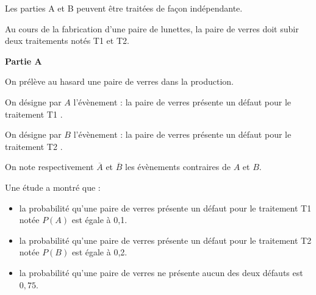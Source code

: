 \bigskip

Les parties A et B peuvent être traitées de façon indépendante.

\medskip

Au cours de la fabrication d'une paire de lunettes, la paire de verres doit subir deux traitements notés T1 et T2.

\bigskip

\textbf{Partie A}

\medskip

On prélève au hasard une paire de verres dans la production.

On désigne par $A$ l'évènement : \og la paire de verres présente un défaut pour le traitement T1 \fg.

On désigne par $B$ l'évènement : \og la paire de verres présente un défaut pour le traitement T2 \fg.

On note respectivement $\overline{A}$ et $\overline{B}$ les évènements contraires de $A$ et $B$.

Une étude a montré que :

\begin{itemize}
\item la probabilité qu'une paire de verres présente un défaut pour le traitement T1 notée $P(A)$ est égale à 0,1.
\item la probabilité qu'une paire de verres présente un défaut pour le traitement T2 notée $P(B)$ est égale à 0,2.
\item la probabilité qu'une paire de verres ne présente aucun des deux défauts est $0,75$.
\end{itemize}

\medskip


